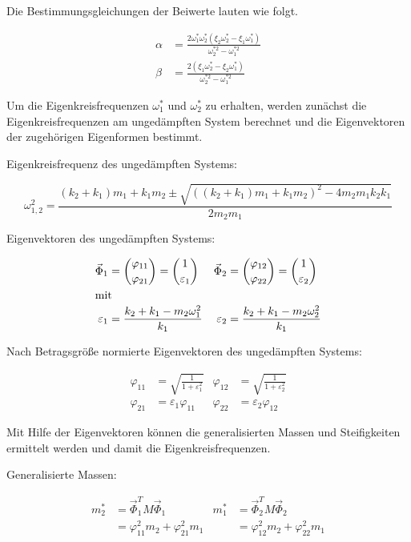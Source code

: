 Die Bestimmungsgleichungen der Beiwerte lauten wie folgt. \cite{Shambhu}

\begin{align*}
\alpha &= \frac{2 \omega_1^* \omega_2^* (\xi_2 \omega_2^* - \xi_1 \omega_1^*)}{\omega_2^{*2} - \omega_1^{*2}}\\
\beta  &= \frac{2 (\xi_1 \omega_2^* - \xi_2 \omega_1^*)}{\omega_2^{*2} - \omega_1^{*2}}
\end{align*}

Um die Eigenkreisfrequenzen $\omega_1^*$ und $\omega_2^*$ zu erhalten, werden zunächst die Eigenkreisfrequenzen am ungedämpften System berechnet und die Eigenvektoren der zugehörigen Eigenformen bestimmt.

Eigenkreisfrequenz des ungedämpften Systems:

\begin{equation*}
\omega_{1,2}^2 = \frac{(k_2 + k_1) m_1 + k_1 m_2 \pm \sqrt{((k_2 + k_1) m_1 + k_1 m_2)^2 - 4 m_2 m_1 k_2 k_1}}{2 m_2 m_1}
\end{equation*}

Eigenvektoren des ungedämpften Systems:

\begin{align*}
\vec{\Phi}_1 &= \binom{\varphi_{11}}{\varphi_{21}} = \binom{1}{\varepsilon_1} & \vec{\Phi}_2 &= \binom{\varphi_{12}}{\varphi_{22}} = \binom{1}{\varepsilon_2}\\
\intertext{mit}
\varepsilon_1 &= \frac{k_2 + k_1 - m_2 \omega_1^2}{k_1} & \varepsilon_2 &= \frac{k_2 + k_1 - m_2 \omega_2^2}{k_1}
\end{align*}

Nach Betragsgröße normierte Eigenvektoren des ungedämpften Systems:

\begin{align*}
\varphi_{11} &= \sqrt{\frac{1}{1 + \varepsilon_1^2}}  &  \varphi_{12} &= \sqrt{\frac{1}{1 + \varepsilon_2^2}}\\
\varphi_{21} &= \varepsilon_1 \varphi_{11}            &  \varphi_{22} &= \varepsilon_2 \varphi_{12}
\end{align*}

Mit Hilfe der Eigenvektoren können die generalisierten Massen und Steifigkeiten ermittelt werden und damit die Eigenkreisfrequenzen.

Generalisierte Massen:

\begin{align*}
m_2^* &= \vec{\Phi}_1^T M \vec{\Phi}_1               &   m_1^* &= \vec{\Phi}_2^T M \vec{\Phi}_2\\
      &= \varphi_{11}^2 m_2 + \varphi_{21}^2 m_1     &         &= \varphi_{12}^2 m_2 + \varphi_{22}^2 m_1
\end{align*}

